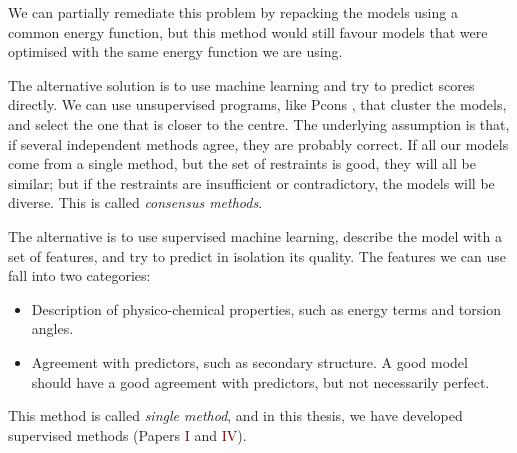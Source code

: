 We can partially remediate this problem by repacking the models using a common energy function, but this method would still favour models that were optimised with the same energy function we are using.


The alternative solution is to use machine learning and try to predict scores directly.
We can use unsupervised programs, like Pcons \citep{pcons}, that cluster the models, and select the one that is closer to the centre.
The underlying assumption is that, if several independent methods agree, they are probably correct.
If all our models come from a single method, but the set of restraints is good, they will all be similar; but if the restraints are insufficient or contradictory, the models will be diverse.
This is called \emph{consensus methods}.

The alternative is to use supervised machine learning,
describe the model with a set of features, and try to predict in isolation its quality.
The features we can use fall into two categories:

\begin{itemize}
\item Description of physico-chemical properties, such as energy terms and torsion angles.
\item Agreement with predictors, such as secondary structure. A good model should have a good agreement with predictors, but not necessarily perfect.
\end{itemize}

This method is called \emph{single method}, and in this thesis, we have developed supervised methods (Papers \textcolor{Maroon}{I} and \textcolor{Maroon}{IV}).

